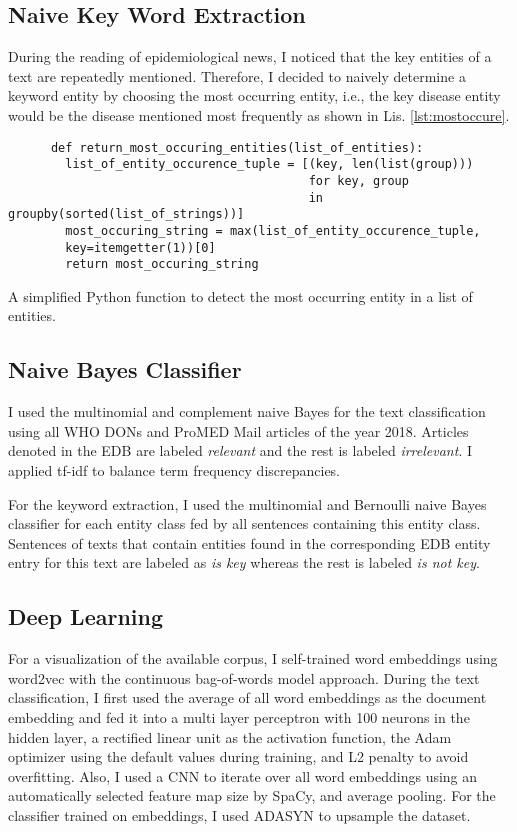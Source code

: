 \subsection{Naive Key Word Extraction}
  During the reading of epidemiological news, I noticed that the key entities of a text are repeatedly mentioned.
  Therefore, I decided to naively determine a keyword entity by choosing the most occurring entity, i.e., the key disease entity would be the disease mentioned most frequently as shown in Lis. \ref{lst:mostoccure}.
  \begin{listing}[h!]
    \begin{verbatim}
      def return_most_occuring_entities(list_of_entities):
        list_of_entity_occurence_tuple = [(key, len(list(group)))
                                          for key, group
                                          in groupby(sorted(list_of_strings))]
        most_occuring_string = max(list_of_entity_occurence_tuple,
        key=itemgetter(1))[0]
        return most_occuring_string
    \end{verbatim}
    \caption{A simplified Python function to detect the most occurring entity in a list of entities.}
    \label{lst:mostoccure}
  \end{listing}

\subsection{Naive Bayes Classifier}
  I used the multinomial and complement naive Bayes for the text classification using all WHO DONs and ProMED Mail articles of the year 2018.
  Articles denoted in the EDB are labeled \textsl{relevant} and the rest is labeled \textsl{irrelevant}. I applied tf-idf to balance term frequency discrepancies.

  For the keyword extraction, I used the multinomial and Bernoulli naive Bayes classifier for each entity class fed by all sentences containing this entity class.
  Sentences of texts that contain entities found in the corresponding EDB entity entry for this text are labeled as \textsl{is key} whereas the rest is labeled \textsl{is not key}.

\subsection{Deep Learning}
  For a visualization of the available corpus, I self-trained word embeddings using word2vec with the continuous bag-of-words model approach.
  During the text classification, I first used the average of all word embeddings as the document embedding and fed it into a multi layer perceptron with 100 neurons in the hidden layer, a rectified linear unit as the activation function, the Adam optimizer using the default values during training, and L2 penalty to avoid overfitting.
  Also, I used a CNN to iterate over all word embeddings using an automatically selected feature map size by SpaCy, and average pooling.
  For the classifier trained on embeddings, I used ADASYN to upsample the dataset.

